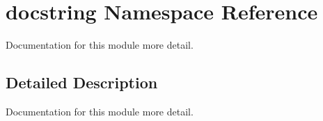 \hypertarget{namespacedocstring}{\section{docstring Namespace Reference}
\label{namespacedocstring}
}


Documentation for this module more detail.  




\subsection{Detailed Description}
Documentation for this module more detail. 